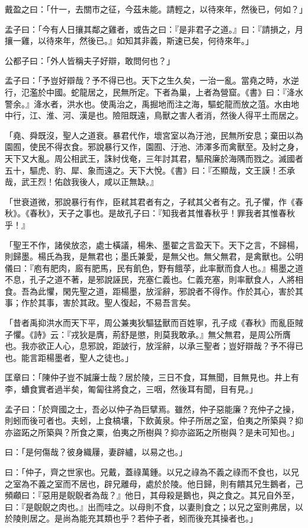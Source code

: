 \documentclass[12pt,a4paper]{ctexbook}
\begin{document}
戴盈之曰：「什一，去關市之征，今茲未能。請輕之，以待來年，然後已，何如？」\par
孟子曰：「今有人日攘其鄰之雞者，或告之曰：『是非君子之道。』曰：『請損之，月攘一雞，以待來年，然後已。』如知其非義，斯速已矣，何待來年。」\par
公都子曰：「外人皆稱夫子好辯，敢問何也？」\par
孟子曰：「予豈好辯哉？予不得已也。天下之生久矣，一治一亂。當堯之時，水逆行，氾濫於中國。蛇龍居之，民無所定。下者為巢，上者為營窟。《書》曰：『洚水警余。』洚水者，洪水也。使禹治之，禹掘地而注之海，驅蛇龍而放之菹。水由地中行，江、淮、河、漢是也。險阻既遠，鳥獸之害人者消，然後人得平土而居之。\par
「堯、舜既沒，聖人之道衰。暴君代作，壞宮室以為汙池，民無所安息；棄田以為園囿，使民不得衣食。邪說暴行又作，園囿、汙池、沛澤多而禽獸至。及紂之身，天下又大亂。周公相武王，誅紂伐奄，三年討其君，驅飛廉於海隅而戮之。滅國者五十，驅虎、豹、犀、象而遠之。天下大悅。《書》曰：『丕顯哉，文王謨！丕承哉，武王烈！佑啟我後人，咸以正無缺。』\par
「世衰道微，邪說暴行有作，臣弒其君者有之，子弒其父者有之。孔子懼，作《春秋》。《春秋》，天子之事也。是故孔子曰：『知我者其惟春秋乎！罪我者其惟春秋乎！』\par
「聖王不作，諸侯放恣，處士橫議，楊朱、墨翟之言盈天下。天下之言，不歸楊，則歸墨。楊氏為我，是無君也；墨氏兼愛，是無父也。無父無君，是禽獸也。公明儀曰：『庖有肥肉，廄有肥馬，民有飢色，野有餓莩，此率獸而食人也。』楊墨之道不息，孔子之道不著，是邪說誣民，充塞仁義也。仁義充塞，則率獸食人，人將相食。吾為此懼，閑先聖之道，距楊墨，放淫辭，邪說者不得作。作於其心，害於其事；作於其事，害於其政。聖人復起，不易吾言矣。\par
「昔者禹抑洪水而天下平，周公兼夷狄驅猛獸而百姓寧，孔子成《春秋》而亂臣賊子懼。《詩》云：『戎狄是膺，荊舒是懲，則莫我敢承。』無父無君，是周公所膺也。我亦欲正人心，息邪說，距詖行，放淫辭，以承三聖者；豈好辯哉？予不得已也。能言距楊墨者，聖人之徒也。」\par
匡章曰：「陳仲子豈不誠廉士哉？居於陵，三日不食，耳無聞，目無見也。井上有李，螬食實者過半矣，匍匐往將食之，三咽，然後耳有聞，目有見。」\par
孟子曰：「於齊國之士，吾必以仲子為巨擘焉。雖然，仲子惡能廉？充仲子之操，則蚓而後可者也。夫蚓，上食槁壤，下飲黃泉。仲子所居之室，伯夷之所築與？抑亦盜跖之所築與？所食之粟，伯夷之所樹與？抑亦盜跖之所樹與？是未可知也。」\par
曰：「是何傷哉？彼身織屨，妻辟纑，以易之也。」\par
曰：「仲子，齊之世家也。兄戴，蓋祿萬鍾。以兄之祿為不義之祿而不食也，以兄之室為不義之室而不居也，辟兄離母，處於於陵。他日歸，則有饋其兄生鵝者，己頻顣曰：『惡用是鶃鶃者為哉？』他日，其母殺是鵝也，與之食之。其兄自外至，曰：『是鶃鶃之肉也。』出而哇之。以母則不食，以妻則食之；以兄之室則弗居，以於陵則居之。是尚為能充其類也乎？若仲子者，蚓而後充其操者也。」\par
\end{document}
